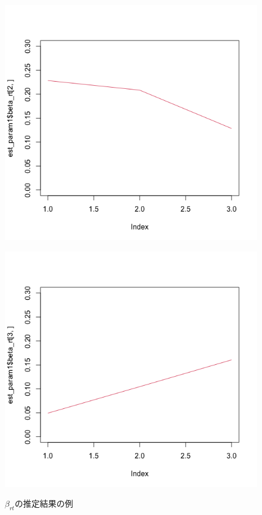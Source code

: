 \documentclass[a4paper,11pt,oneside,openany]{jsbook}
\begin{document}
\begin{figure}[]
\centering
 \begin{minipage}[b]{0.4\linewidth}
  \centering
  \includegraphics[keepaspectratio,scale=0.25]{img/beta_rt_r_2.png}
  \label{1}
 \end{minipage}
 \begin{minipage}[b]{0.4\linewidth}
  \centering
  \includegraphics[keepaspectratio,scale=0.25]{img/beta_rt_r_3.png}
  \label{2}
 \end{minipage}
 \caption{$\beta_{rt}$の推定結果の例}\label{beta_rt_data}
\end{figure}
\end{document}
